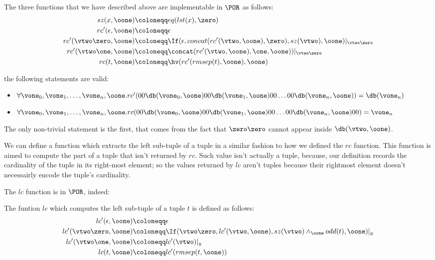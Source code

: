 \begin{defn}
The three functions that we have described above are implementable in $\POR$ as follows:
\begin{align*}
sz(x, \oone)&\coloneqq eq(lst(x), \zero)\\
rc'(\epsilon, \oone)&\coloneqq \epsilon\\
rc'(\vtwo\zero, \oone)&\coloneqq \If(\epsilon, concat (rc'(\vtwo, \oone),\zero), sz(\vtwo), \oone)|_{\vtwo\zero}\\
rc'(\vtwo\one, \oone)&\coloneqq  \concat (rc'(\vtwo, \oone), \one, \oone))|_{\vtwo\zero}\\
rc (t, \oone)&\coloneqq \hv(rc'(rmsep(t), \oone), \oone)
\end{align*}
\end{defn}

\begin{remark}[Correctness of $rc$] the following statements are valid:\\
\begin{itemize}
\item $\forall \vone_0, \vone_1, \ldots,\vone_n, \oone. rc' (00\db(\vone_0, \oone) 00 \db(\vone_1, \oone) 00 \ldots 00 \db(\vone_n, \oone)) = \db(\vone_n)$
\item $\forall \vone_0, \vone_1, \ldots,\vone_n, \oone. rc (00\db(\vone_0, \oone) 00 \db(\vone_1, \oone) 00 \ldots 00 \db(\vone_n, \oone) 00) = \vone_n$
\end{itemize}
\end{remark}

The only non-trivial statement is the first, that comes from the fact that $\zero\zero$ cannot appear inside $\db(\vtwo, \oone)$.

We can define a function which extracts the left sub-tuple of a tuple in a similar fashion to how we defined the $rc$ function. This function is aimed to compute the part of a tuple that isn't returned by $rc$. Such value isn't actually a tuple, because, our definition records the cardinality of the tuple in its right-most element; so the values returned by $lc$ aren't tuples because their rightmost element doesn't necessairly encode the tuple's cardinality.

The $lc$ function is in $\POR$, indeed:

\begin{defn}

The funtion $lc$ which computes the left sub-tuple of a tuple $t$ is defined as follows:
\begin{align*}
lc'(\epsilon, \oone)&\coloneqq \epsilon\\
lc'(\vtwo\zero, \oone)&\coloneqq \If(\vtwo\zero, lc'(\vtwo, \oone), sz(\vtwo) \land_\oone odd(t), \oone)|_y\\
lc'(\vtwo\one, \oone)&\coloneqq lc'(\vtwo)|_y\\
lc (t, \oone)&\coloneqq lc'(rmsep(t, \oone))
\end{align*}
\end{defn}

